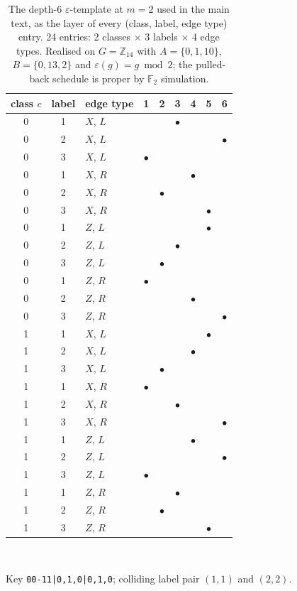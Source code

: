 \begin{table}[tb]
\centering
\small
\caption{The depth-6 $\varepsilon$-template at $m=2$ used in the main text, as the layer of every (class, label, edge type) entry.  24 entries: 2 classes $\times$ 3 labels $\times$ 4 edge types.  Realised on $G=\mathbb{Z}_{14}$ with $A=\{0, 1, 10\}$, $B=\{0, 13, 2\}$ and $\varepsilon(g)=g \bmod 2$; the pulled-back schedule is proper by $\mathbb{F}_2$ simulation.}
\label{tabS:templatem2}
\begin{tabular}{cclcccccc}
\toprule
class $c$ & label & edge type & 1 & 2 & 3 & 4 & 5 & 6 \\
\midrule
0 & 1 & $X$, $L$ &  &  & $\bullet$ &  &  &  \\
0 & 2 & $X$, $L$ &  &  &  &  &  & $\bullet$ \\
0 & 3 & $X$, $L$ & $\bullet$ &  &  &  &  &  \\
0 & 1 & $X$, $R$ &  &  &  & $\bullet$ &  &  \\
0 & 2 & $X$, $R$ &  & $\bullet$ &  &  &  &  \\
0 & 3 & $X$, $R$ &  &  &  &  & $\bullet$ &  \\
0 & 1 & $Z$, $L$ &  &  &  &  & $\bullet$ &  \\
0 & 2 & $Z$, $L$ &  &  & $\bullet$ &  &  &  \\
0 & 3 & $Z$, $L$ &  & $\bullet$ &  &  &  &  \\
0 & 1 & $Z$, $R$ & $\bullet$ &  &  &  &  &  \\
0 & 2 & $Z$, $R$ &  &  &  & $\bullet$ &  &  \\
0 & 3 & $Z$, $R$ &  &  &  &  &  & $\bullet$ \\
1 & 1 & $X$, $L$ &  &  &  &  & $\bullet$ &  \\
1 & 2 & $X$, $L$ &  &  &  & $\bullet$ &  &  \\
1 & 3 & $X$, $L$ &  & $\bullet$ &  &  &  &  \\
1 & 1 & $X$, $R$ & $\bullet$ &  &  &  &  &  \\
1 & 2 & $X$, $R$ &  &  & $\bullet$ &  &  &  \\
1 & 3 & $X$, $R$ &  &  &  &  &  & $\bullet$ \\
1 & 1 & $Z$, $L$ &  &  &  & $\bullet$ &  &  \\
1 & 2 & $Z$, $L$ &  &  &  &  &  & $\bullet$ \\
1 & 3 & $Z$, $L$ & $\bullet$ &  &  &  &  &  \\
1 & 1 & $Z$, $R$ &  &  & $\bullet$ &  &  &  \\
1 & 2 & $Z$, $R$ &  & $\bullet$ &  &  &  &  \\
1 & 3 & $Z$, $R$ &  &  &  &  & $\bullet$ &  \\
\bottomrule
\end{tabular}
\\[2pt]\begin{minipage}{\linewidth}\footnotesize Key \texttt{00-11|0,1,0|0,1,0}; colliding label pair $(1,1)$ and $(2,2)$.\end{minipage}
\end{table}
